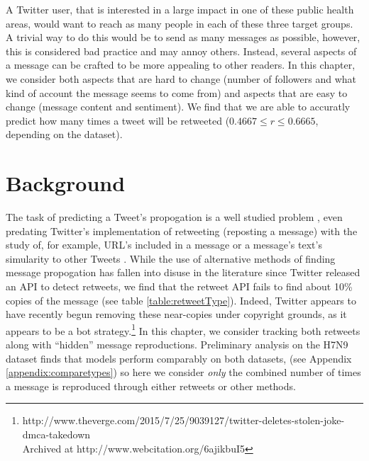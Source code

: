 A Twitter user, that is interested in a large impact in one of these public health areas, would want to reach as many people in each of these three target groups. A trivial way to do this would be to send as many messages as possible, however, this is considered bad practice and may annoy others. Instead, several aspects of a message can be crafted to be more appealing to other readers. In this chapter, we consider both aspects that are hard to change (number of followers and what kind of account the message seems to come from) and aspects that are easy to change (message content and sentiment). We find that we are able to accuratly predict how many times a tweet will be retweeted (\(0.4667 \leq r \leq 0.6665\), depending on the dataset).


\section{Background}

The task of predicting a Tweet's propogation is a well studied problem \cite{Suh:2010uw,Ediger:cn,Weng:2012dd,gransee2012,Kim2012retweet,Osborne2011rt,Lerman:2010vo,Anonymous:iQRVCsVz,kwak2010twitter}, even predating Twitter's implementation of retweeting (reposting a message) with the study of, for example, URL's included in a message \cite{kwak2010twitter} or a message's text's simularity to other Tweets \cite{cosme2015,Dou:2012vy}. While the use of alternative methods of finding message propogation has fallen into disuse in the literature since Twitter released an API to detect retweets, we find that the retweet API fails to find about 10\% copies of the message (see table \ref{table:retweetType}). Indeed, Twitter appears to have recently begun removing these near-copies under copyright grounds, as it appears to be a bot strategy.\footnote{http://www.theverge.com/2015/7/25/9039127/twitter-deletes-stolen-joke-dmca-takedown \\ Archived at http://www.webcitation.org/6ajikbuI5} In this chapter, we consider tracking both retweets along with ``hidden'' message reproductions. Preliminary analysis on the H7N9 dataset finds that models perform comparably on both datasets, (see Appendix \ref{appendix:comparetypes}) so here we consider \emph{only} the combined number of times a message is reproduced through either retweets or other methods. 



